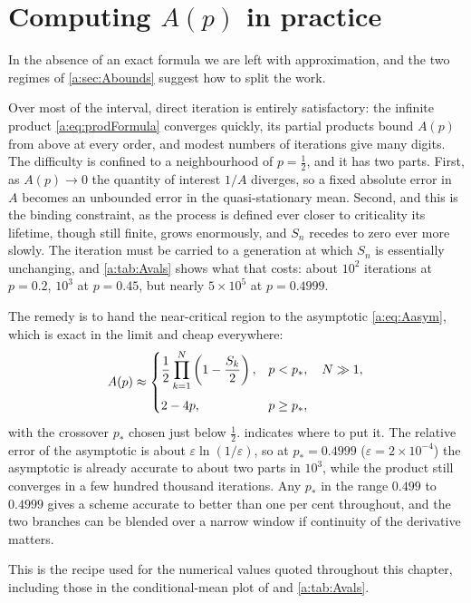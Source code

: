 \section{Computing \texorpdfstring{$A(p)$}{A(p)} in practice}
\label{a:sec:practical}

In the absence of an exact formula we are left with approximation, and the two
regimes of \cref{a:sec:Abounds} suggest how to split the work.

Over most of the interval, direct iteration is entirely satisfactory: the infinite
product \cref{a:eq:prodFormula} converges quickly, its partial products bound $A(p)$
from above at every order, and modest numbers of iterations give many digits. The
difficulty is confined to a neighbourhood of $p=\tfrac12$, and it has two parts.
First, as $A(p)\to0$ the quantity of interest $1/A$ diverges, so a fixed absolute
error in $A$ becomes an unbounded error in the quasi-stationary mean. Second, and
this is the binding constraint, as the process is defined ever closer to
criticality its lifetime, though still finite, grows enormously, and $S_n$ recedes
to zero ever more slowly. The iteration must be carried to a generation at which
$S_n$ is essentially unchanging, and \cref{a:tab:Avals} shows what that costs: about
$10^2$ iterations at $p=0.2$, $10^3$ at $p=0.45$, but nearly $5\times10^5$ at
$p=0.4999$.

The remedy is to hand the near-critical region to the asymptotic \cref{a:eq:Aasym},
which is exact in the limit and cheap everywhere:
\begin{equation}
\label{a:eq:Apractical}
A(p) \approx
\begin{cases}
\displaystyle \frac12\prod_{k=1}^{N}\left(1-\frac{S_k}{2}\right), & p<p_\ast,\quad N\gg1,\\[14pt]
2-4p, & p\ge p_\ast,
\end{cases}
\end{equation}
with the crossover $p_\ast$ chosen just below $\tfrac12$.  indicates
where to put it. The relative error of the asymptotic is about
$\varepsilon\ln(1/\varepsilon)$, so at $p_\ast = 0.4999$
($\varepsilon = 2\times10^{-4}$) the asymptotic is already accurate to about two
parts in $10^3$, while the product still converges in a few hundred thousand
iterations. Any $p_\ast$ in the range $0.499$ to $0.4999$ gives a scheme accurate
to better than one per cent throughout, and the two branches can be blended over a
narrow window if continuity of the derivative matters.

This is the recipe used for the numerical values quoted throughout this chapter,
including those in the conditional-mean plot of \ChM and \cref{a:tab:Avals}.
